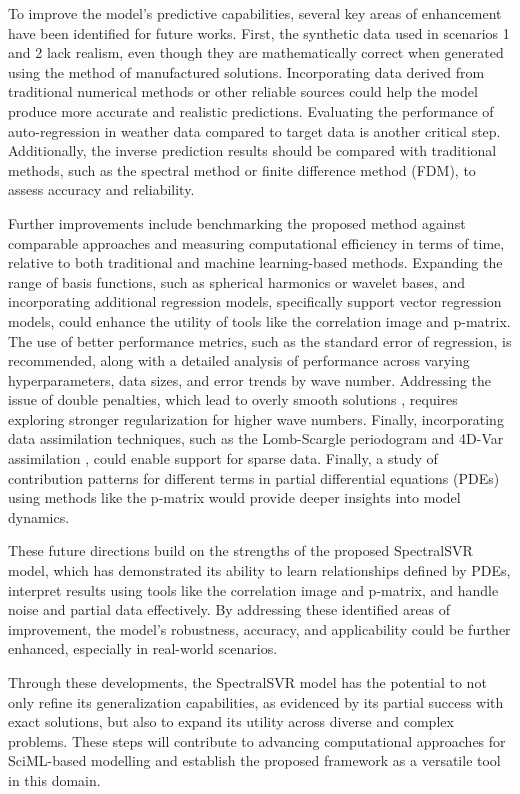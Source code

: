 \documentclass[preprint,12pt,times,authoryear]{elsarticle}
\begin{document}
To improve the model's predictive capabilities, several key areas of enhancement have been identified for future works. First, the synthetic data used in scenarios 1 and 2 lack realism, even though they are mathematically correct when generated using the method of manufactured solutions. Incorporating data derived from traditional numerical methods or other reliable sources could help the model produce more accurate and realistic predictions. Evaluating the performance of auto-regression in weather data compared to target data is another critical step. Additionally, the inverse prediction results should be compared with traditional methods, such as the spectral method or finite difference method (FDM), to assess accuracy and reliability.

Further improvements include benchmarking the proposed method against comparable approaches and measuring computational efficiency in terms of time, relative to both traditional and machine learning-based methods. Expanding the range of basis functions, such as spherical harmonics or wavelet bases, and incorporating additional regression models, specifically support vector regression models, could enhance the utility of tools like the correlation image and p-matrix. The use of better performance metrics, such as the standard error of regression, is recommended, along with a detailed analysis of performance across varying hyperparameters, data sizes, and error trends by wave number. Addressing the issue of double penalties, which lead to overly smooth solutions \citep{brownForecastsSpatialFields2011,NIPS2017_44a2e080}, requires exploring stronger regularization for higher wave numbers. Finally, incorporating data assimilation techniques, such as the Lomb-Scargle periodogram \citep{vanderplasUnderstandingLombScargle2018} and 4D-Var assimilation \citep{puNumericalWeatherPrediction2018,parkDataAssimilationAtmospheric2013}, could enable support for sparse data. Finally, a study of contribution patterns for different terms in partial differential equations (PDEs) using methods like the p-matrix would provide deeper insights into model dynamics.

These future directions build on the strengths of the proposed SpectralSVR model, which has demonstrated its ability to learn relationships defined by PDEs, interpret results using tools like the correlation image and p-matrix, and handle noise and partial data effectively. By addressing these identified areas of improvement, the model's robustness, accuracy, and applicability could be further enhanced, especially in real-world scenarios.

Through these developments, the SpectralSVR model has the potential to not only refine its generalization capabilities, as evidenced by its partial success with exact solutions, but also to expand its utility across diverse and complex problems. These steps will contribute to advancing computational approaches for SciML-based modelling and establish the proposed framework as a versatile tool in this domain.


\end{document}
